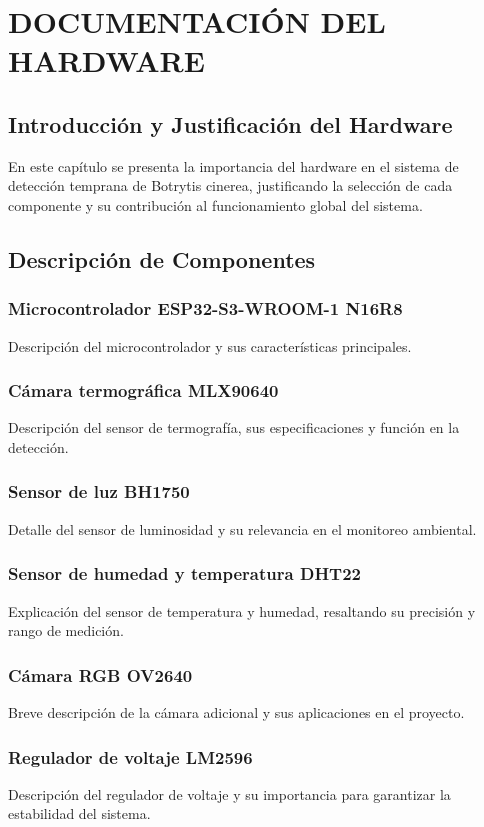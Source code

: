 \chapter{DOCUMENTACIÓN DEL HARDWARE}

\section{Introducción y Justificación del Hardware}
En este capítulo se presenta la importancia del hardware en el sistema de detección temprana de Botrytis cinerea, justificando la selección de cada componente y su contribución al funcionamiento global del sistema.

\section{Descripción de Componentes}
\subsection{Microcontrolador ESP32-S3-WROOM-1 N16R8}
Descripción del microcontrolador y sus características principales.

\subsection{Cámara termográfica MLX90640}
Descripción del sensor de termografía, sus especificaciones y función en la detección.

\subsection{Sensor de luz BH1750}
Detalle del sensor de luminosidad y su relevancia en el monitoreo ambiental.

\subsection{Sensor de humedad y temperatura DHT22}
Explicación del sensor de temperatura y humedad, resaltando su precisión y rango de medición.

\subsection{Cámara RGB OV2640}
Breve descripción de la cámara adicional y sus aplicaciones en el proyecto.

\subsection{Regulador de voltaje LM2596}
Descripción del regulador de voltaje y su importancia para garantizar la estabilidad del sistema.

